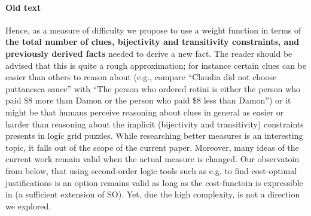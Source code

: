 \paragraph{Old text} 
Hence, as a measure of difficulty we propose to use a weight function in terms of \textbf{the total number of clues, bijectivity and transitivity constraints, and previously derived facts} needed to derive a new fact. 
The reader should be advised that this is quite a rough approximation; for instance certain clues can be easier than others to reason about (e.g., compare ``Claudia did not choose puttanesca sauce'' with ``The person who ordered rotini is either the person who paid \$8 more than Damon or the person who paid \$8 less than Damon'') or it might be that humans perceive reasoning about clues in general as easier or harder than reasoning about the implicit (bijectivity and transitivity) constraints presents in logic grid puzzles. While researching better measures is an interesting topic, it falls out of the scope of the current paper. Moreover, many ideas of the current work remain valid when the actual measure is changed. 
Our observatoin from below, that using second-order logic tools such as e.g. \cite{proB,kr/BogaertsTS16} to find cost-optimal justifications is an option remains valid as long as the cost-functoin is expressible in (a sufficient extension of SO). Yet, due the high complexity, is not a direction we explored. 

% 
% 
